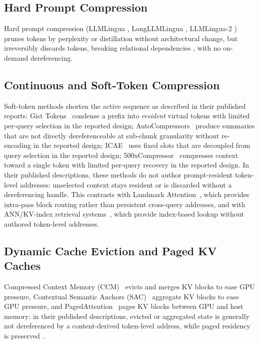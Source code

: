 \documentclass[conference]{IEEEtran}
\begin{document}
\subsection{Hard Prompt Compression}
Hard prompt compression (LLMLingua \cite{jiang2023llmlingua}, LongLLMLingua \cite{jiang2024longllmlingua}, LLMLingua-2 \cite{pan2024llmlingua2}) prunes tokens by perplexity or distillation without architectural change, but irreversibly discards tokens, breaking relational dependencies \cite{lajewska2025preservation}, with no on-demand dereferencing.

\subsection{Continuous and Soft-Token Compression}
Soft-token methods shorten the active sequence as described in their published reports: Gist Tokens~\cite{mu2023gist} condense a prefix into \emph{resident} virtual tokens with limited per-query selection in the reported design; AutoCompressors~\cite{chevalier2023autocompressors} produce summaries that are not directly dereferenceable at sub-chunk granularity without re-encoding in the reported design; ICAE~\cite{ge2024icae} uses fixed slots that are decoupled from query selection in the reported design; 500xCompressor~\cite{li2025500xcompressor} compresses context toward a single token with limited per-query recovery in the reported design. In their published descriptions, these methods do not author prompt-resident token-level addresses: unselected context stays resident or is discarded without a dereferencing handle. This contrasts with Landmark Attention~\cite{mohtashami2023landmark}, which provides intra-pass block routing rather than persistent cross-query addresses, and with ANN/KV-index retrieval systems~\cite{liu2025retrievalattention, tang2024quest}, which provide index-based lookup without authored token-level addresses.

\subsection{Dynamic Cache Eviction and Paged KV Caches}
Compressed Context Memory (CCM)~\cite{kim2024ccm} evicts and merges KV blocks to ease GPU pressure, Contextual Semantic Anchors (SAC)~\cite{liu2025sac} aggregate KV blocks to ease GPU pressure, and PagedAttention~\cite{kwon2023pagedattention} pages KV blocks between GPU and host memory: in their published descriptions, evicted or aggregated state is generally not dereferenced by a content-derived token-level address, while paged residency is preserved~\cite{kwon2023pagedattention}.
\end{document}
